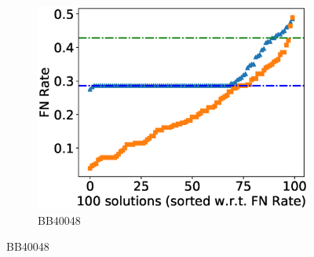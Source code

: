 \begin{figure}[!htbp]
\begin{adjustwidth}{-1cm}{-1cm}
\begin{subfigure}{0.22\textwidth}
			\includegraphics[width=\columnwidth]{Figure/summary/precomputedInit/Balibase/BB40048_fnrate_density_single_run}
			\caption{BB40048}
		\end{subfigure}
		

\end{adjustwidth}
\end{figure}
